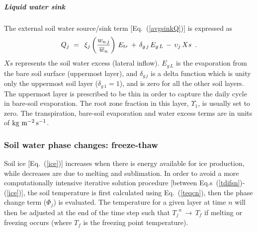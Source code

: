 \subparagraph{Liquid water sink}
%
The external soil water source/sink term 
[Eq.~(\ref{avgsinkQ})] is expressed as
%
%
\begin{equation}
\label{netsink}
Q_j \,\,=\,\, 
\,\xi_j \left({w_{n\,j}\over {\overline w}_n}\right)\,E_{tr} \,+\, 
\delta_{g\,j} \,E_{g\,L}
\,-\,\upsilon_j \,Xs 
\,\,\, .
\end{equation}
%
%
$Xs$ represents the soil water excess (lateral
inflow). $E_{g\,L}$ is the evaporation from the bare soil
surface (uppermost layer),
and $\delta_{g\,j}$ is a delta function which
is unity only the uppermost soil layer
($\delta_{g\,1}=1$), and is zero
for all the other soil layers. The uppermost layer is prescribed to
be thin in order to capture the daily cycle in bare-soil evaporation.
The root zone fraction in this layer, $\Upsilon_1$, is usually set to zero.
The transpiration,
bare-soil evaporation and water excess terms are in
units of ${\rm kg \,\,m^{-2}\,s^{-1}}$. 



\subsubsection{Soil water phase changes: freeze-thaw}
\label{sec:isba_soil_ice}
%
Soil ice [Eq.~(\ref{ice})] increases when there
is energy available for
ice production, while decreases are due to melting
and sublimation.
In order to avoid a more computationally intensive iterative 
solution procedure [between Eq.s~(\ref{tdifsn})-(\ref{ice})],
the soil temperature is first calculated using Eq.~(\ref{teqcn}),
then the phase change term ($\Phi_j$) is evaluated.
The temperature for a given layer
at time $n$ will then be adjusted at the end of the time
step such that ${T_j}^{n}\,\rightarrow\,T_f$ if melting
or freezing occurs (where $T_f$ is the freezing point temperature).

